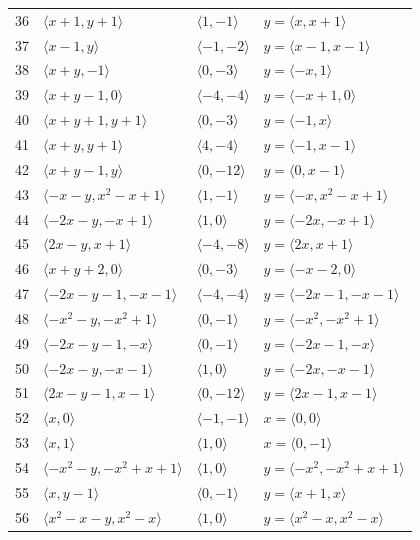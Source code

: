 \documentclass[11pt]{article}
\begin{document}
\begin{longtable}{@{}rlll@{}}
36 & $\langle x+1,y+1\rangle$ & $\langle 1,-1\rangle$ & $y=\langle x,x+1\rangle$\\
37 & $\langle x-1,y\rangle$ & $\langle -1,-2\rangle$ & $y=\langle x-1,x-1\rangle$\\
38 & $\langle x+y,-1\rangle$ & $\langle 0,-3\rangle$ & $y=\langle -x,1\rangle$\\
39 & $\langle x+y-1,0\rangle$ & $\langle -4,-4\rangle$ & $y=\langle -x+1,0\rangle$\\
40 & $\langle x+y+1,y+1\rangle$ & $\langle 0,-3\rangle$ & $y=\langle -1,x\rangle$\\
41 & $\langle x+y,y+1\rangle$ & $\langle 4,-4\rangle$ & $y=\langle -1,x-1\rangle$\\
42 & $\langle x+y-1,y\rangle$ & $\langle 0,-12\rangle$ & $y=\langle 0,x-1\rangle$\\
43 & $\langle -x-y,x^{2}-x+1\rangle$ & $\langle 1,-1\rangle$ & $y=\langle -x,x^{2}-x+1\rangle$\\
44 & $\langle -2x-y,-x+1\rangle$ & $\langle 1,0\rangle$ & $y=\langle -2x,-x+1\rangle$\\
45 & $\langle 2x-y,x+1\rangle$ & $\langle -4,-8\rangle$ & $y=\langle 2x,x+1\rangle$\\
46 & $\langle x+y+2,0\rangle$ & $\langle 0,-3\rangle$ & $y=\langle -x-2,0\rangle$\\
47 & $\langle -2x-y-1,-x-1\rangle$ & $\langle -4,-4\rangle$ & $y=\langle -2x-1,-x-1\rangle$\\
48 & $\langle -x^{2}-y,-x^{2}+1\rangle$ & $\langle 0,-1\rangle$ & $y=\langle -x^{2},-x^{2}+1\rangle$\\
49 & $\langle -2x-y-1,-x\rangle$ & $\langle 0,-1\rangle$ & $y=\langle -2x-1,-x\rangle$\\
50 & $\langle -2x-y,-x-1\rangle$ & $\langle 1,0\rangle$ & $y=\langle -2x,-x-1\rangle$\\
51 & $\langle 2x-y-1,x-1\rangle$ & $\langle 0,-12\rangle$ & $y=\langle 2x-1,x-1\rangle$\\
52 & $\langle x,0\rangle$ & $\langle -1,-1\rangle$ & $x=\langle 0,0\rangle$\\
53 & $\langle x,1\rangle$ & $\langle 1,0\rangle$ & $x=\langle 0,-1\rangle$\\
54 & $\langle -x^{2}-y,-x^{2}+x+1\rangle$ & $\langle 1,0\rangle$ & $y=\langle -x^{2},-x^{2}+x+1\rangle$\\
55 & $\langle x,y-1\rangle$ & $\langle 0,-1\rangle$ & $y=\langle x+1,x\rangle$\\
56 & $\langle x^{2}-x-y,x^{2}-x\rangle$ & $\langle 1,0\rangle$ & $y=\langle x^{2}-x,x^{2}-x\rangle$\\

\end{longtable}
\end{document}
